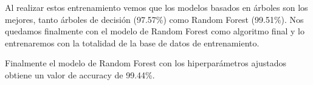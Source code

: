 Al realizar estos entrenamiento vemos que los modelos basados en árboles son los mejores, tanto árboles de decisión (97.57\%) como Random Forest (99.51\%). Nos quedamos finalmente con el modelo de Random Forest como algoritmo final y lo entrenaremos con la totalidad de la base de datos de entrenamiento.

Finalmente el modelo de Random Forest con los hiperparámetros ajustados obtiene un valor de accuracy de 99.44\%. 

